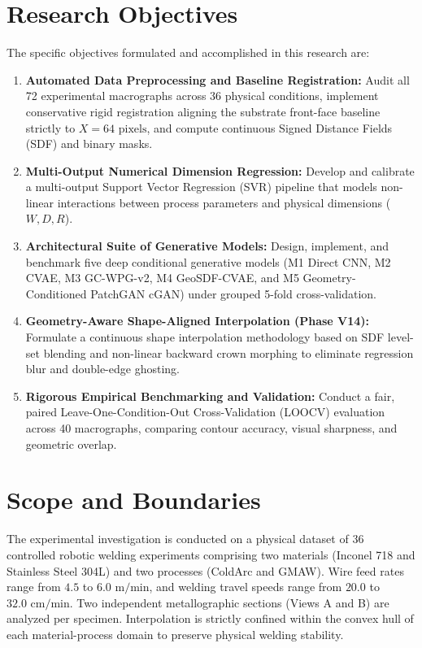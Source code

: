 \documentclass[12pt,a4paper,oneside]{report}
\begin{document}
\section{Research Objectives}
The specific objectives formulated and accomplished in this research are:
\begin{enumerate}
    \item \textbf{Automated Data Preprocessing and Baseline Registration:} Audit all 72 experimental macrographs across 36 physical conditions, implement conservative rigid registration aligning the substrate front-face baseline strictly to $X=64\text{ pixels}$, and compute continuous Signed Distance Fields (SDF) and binary masks.
    \item \textbf{Multi-Output Numerical Dimension Regression:} Develop and calibrate a multi-output Support Vector Regression (SVR) pipeline that models non-linear interactions between process parameters and physical dimensions ($W, D, R$).
    \item \textbf{Architectural Suite of Generative Models:} Design, implement, and benchmark five deep conditional generative models (M1 Direct CNN, M2 CVAE, M3 GC-WPG-v2, M4 GeoSDF-CVAE, and M5 Geometry-Conditioned PatchGAN cGAN) under grouped 5-fold cross-validation.
    \item \textbf{Geometry-Aware Shape-Aligned Interpolation (Phase V14):} Formulate a continuous shape interpolation methodology based on SDF level-set blending and non-linear backward crown morphing to eliminate regression blur and double-edge ghosting.
    \item \textbf{Rigorous Empirical Benchmarking and Validation:} Conduct a fair, paired Leave-One-Condition-Out Cross-Validation (LOOCV) evaluation across 40 macrographs, comparing contour accuracy, visual sharpness, and geometric overlap.
\end{enumerate}

\section{Scope and Boundaries}
The experimental investigation is conducted on a physical dataset of 36 controlled robotic welding experiments comprising two materials (Inconel 718 and Stainless Steel 304L) and two processes (ColdArc and GMAW). Wire feed rates range from $4.5$ to $6.0\text{ m/min}$, and welding travel speeds range from $20.0$ to $32.0\text{ cm/min}$. Two independent metallographic sections (Views A and B) are analyzed per specimen. Interpolation is strictly confined within the convex hull of each material-process domain to preserve physical welding stability.
\end{document}

